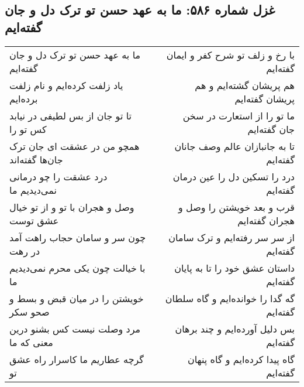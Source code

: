 \begin{center}
\section*{غزل شماره ۵۸۶: ما به عهد حسن تو ترک دل و جان گفته‌ایم}
\label{sec:586}
\begin{longtable}{l p{0.5cm} r}
ما به عهد حسن تو ترک دل و جان گفته‌ایم
&&
با رخ و زلف تو شرح کفر و ایمان گفته‌ایم
\\
یاد زلفت کرده‌ایم و نام زلفت برده‌ایم
&&
هم پریشان گشته‌ایم و هم پریشان گفته‌ایم
\\
تا تو جان از بس لطیفی در نیابد کس تو را
&&
ما تو را از استعارت در سخن جان گفته‌ایم
\\
همچو من در عشقت ای جان ترک جان‌ها گفته‌اند
&&
تا به جانبازان عالم وصف جانان گفته‌ایم
\\
درد عشقت را چو درمانی نمی‌دیدیم ما
&&
درد را تسکین دل را عین درمان گفته‌ایم
\\
وصل و هجران با تو و از تو خیال عشق توست
&&
قرب و بعد خویشتن را وصل و هجران گفته‌ایم
\\
چون سر و سامان حجاب راهت آمد در رهت
&&
از سر سر رفته‌ایم و ترک سامان گفته‌ایم
\\
با خیالت چون یکی محرم نمی‌دیدیم ما
&&
داستان عشق خود را تا به پایان گفته‌ایم
\\
خویشتن را در میان قبض و بسط و صحو سکر
&&
گه گدا را خوانده‌ایم و گاه سلطان گفته‌ایم
\\
مرد وصلت نیست کس بشنو درین معنی که ما
&&
بس دلیل آورده‌ایم و چند برهان گفته‌ایم
\\
گرچه عطاریم ما کاسرار راه عشق تو
&&
گاه پیدا کرده‌ایم و گاه پنهان گفته‌ایم
\\
\end{longtable}
\end{center}
